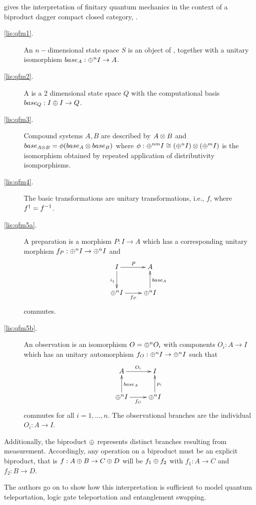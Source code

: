 \cite{abramsky04:catsemquantprot} gives the interpretation of finitary quantum mechanics in the
context of a biproduct dagger compact closed category, \cD.
\begin{description}
  \item[\ref{lis:qfm1}.] An $n-$dimensional state space $S$ is an object of \cD,
    together with a unitary isomorphism $base_{A}:\oplus^{n}I\to A$.
  \item[\ref{lis:qfm2}.] A \qubit is a 2 dimensional state space $Q$ with the computational basis
    $base_{Q}:I\oplus I \to Q$.
  \item[\ref{lis:qfm3}.] Compound systems $A,B$ are described by $A\otimes B$ and
    $base_{A\otimes B} = \phi (base_{A}\otimes base_{B})$ where $\phi:\oplus^{nm}I \cong(\oplus^{n}I)\otimes(\oplus^{m}I)$ is
    the isomorphism obtained by repeated application of distributivity isomporphisms.
  \item[\ref{lis:qfm4}.] The basic transformations are unitary transformations, i.e., $f$, where
    ${f}^{\dagger} = f^{-1}$.
  \item[\ref{lis:qfm5a}.] A preparation is a morphism $P:I \to A$ which has a corresponding unitary
    morphism $f_{P}:\oplus^{n}I\to\oplus^{n}I$ and
    \[
      \xymatrix{
        I \ar[r]^{P} \ar[d]_{i_{1}}& A\\
        \+^{n}I \ar[r]_{f_{P}} & \+^{n}I \ar[u]_{base_{A}}
      }
    \]
    commutes.
  \item[\ref{lis:qfm5b}.] An observation  is an isomorphism $O = \oplus^{n}O_{i}$ with components
    $O_{i}:A \to I$ which has an unitary automorphism $f_{O}:\oplus^{n}I\to\oplus^{n}I$ such that
    \[
      \xymatrix{
        A \ar[r]^{O_{i}} & I\\
        \+^{n}I \ar[r]_{f_{O}}  \ar[u]_{base_{A}} & \+^{n}I \ar[u]_{p_{i}}
      }
    \]
    commutes for all $i=1,\ldots,n$. The observational branches are the individual $O_{i}:A \to I$.
\end{description}
Additionally, the biproduct $\oplus$ represents distinct branches resulting from measurement.
Accordingly, any operation on a biproduct must be an explicit biproduct, that is $f:A\oplus B\to C\oplus D$
will be $f_{1}\oplus f_{2}$ with $f_{1}:A\to C$ and $f_{2}:B\to D$.

The authors go on to show how this interpretation is sufficient to model quantum teleportation,
logic gate teleportation and entanglement swapping.

